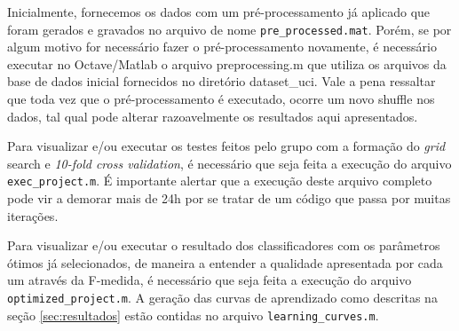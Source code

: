 \documentclass[10pt, conference, compsocconf]{IEEEtran}
\begin{document}
Inicialmente, fornecemos os dados com um pré-processamento já aplicado que 
foram gerados e gravados no arquivo de nome \texttt{pre\_processed.mat}. Porém, se por 
algum motivo for necessário fazer o pré-processamento novamente, é necessário 
executar no Octave/Matlab o arquivo preprocessing.m que utiliza os arquivos da 
base de dados inicial fornecidos no diretório dataset\_uci. Vale a pena 
ressaltar que toda vez que o pré-processamento é executado, ocorre um novo 
shuffle nos dados, tal qual pode alterar razoavelmente os resultados aqui apresentados.

Para visualizar e/ou executar os testes feitos pelo grupo com a formação do 
\textit{grid} search e \textit{10-fold cross validation}, é necessário que seja feita a execução 
do arquivo \texttt{exec\_project.m}. É importante alertar que a execução deste arquivo 
completo pode vir a demorar mais de 24h por se tratar de um código que passa 
por muitas iterações.

Para visualizar e/ou executar o resultado dos classificadores com os parâmetros
ótimos já selecionados, de maneira a entender a qualidade apresentada por cada 
um através da F-medida, é necessário que seja feita a execução do arquivo 
\texttt{optimized\_project.m}.
A geração das curvas de aprendizado como descritas na seção
\ref{sec:resultados} estão contidas no arquivo \texttt{learning\_curves.m}.


\end{document}
